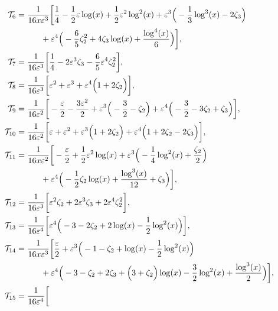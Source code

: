 \begin{align}
% 
\mi_6 &=   \frac{1}{16 x \ep^3}  \bigg[
% 
\frac{1}{4}
-\frac{1}{2} \ep \log (x)
+\frac{1}{2} \ep^2 \log ^2(x)
+\ep^3 \Big(
        -\frac{1}{3} \log ^3(x)
        -2 \zeta_3
\Big)
\nonumber\\& \qquad \quad
+\ep^4 \Big(
        -\frac{6}{5} \zeta_2^2
        +4 \zeta_3 \log (x)
        +\frac{\log ^4(x)}{6}
\Big)
% 
\bigg],
% 
\nonumber\\
% 
\mi_7 &=   \frac{1}{16 \ep^3}  \bigg[
% 
\frac{1}{4}
-2 \ep^3 \zeta_3
-\frac{6}{5} \ep^4 \zeta_2^2
% 
\bigg],
% 
\nonumber\\
% 
\mi_8 &=   \frac{1}{16 \ep^3}  \bigg[
% 
\ep^2
+\ep^3
+\ep^4 \Big(
        1
        +2 \zeta_2
\Big)
% 
\bigg],
% 
\nonumber\\
% 
\mi_9 &=   \frac{1}{16 \ep^2}  \bigg[
% 
-\frac{\ep}{2}
-\frac{3 \ep^2}{2}
+\ep^3 \Big(
        -\frac{3}{2}
        -\zeta_2
\Big)
+\ep^4 \Big(
        -\frac{3}{2}
        -3 \zeta_2
        +\zeta_3
\Big)
% 
\bigg],
% 
\nonumber\\
% 
\mi_{10} &=   \frac{1}{16 \ep^2}  \bigg[
% 
\ep
+\ep^2
+\ep^3 \Big(
        1
        +2 \zeta_2
\Big)
+\ep^4 \Big(
        1
        +2 \zeta_2
        -2 \zeta_3
\Big)
% 
\bigg],
% 
\nonumber\\
% 
\mi_{11} &=   \frac{1}{16 x \ep^2}  \bigg[
% 
-\frac{\ep}{2}
+\frac{1}{2} \ep^2 \log (x)
+\ep^3 \Big(
        -\frac{1}{4} \log ^2(x)
        +\frac{\zeta_2}{2}
\Big)
\nonumber\\& \qquad \quad
+\ep^4 \Big(
        -\frac{1}{2} \zeta_2 \log (x)
        +\frac{\log ^3(x)}{12}
        +\zeta_3
\Big)
% 
\bigg],
% 
\nonumber\\
% 
\mi_{12} &=   \frac{1}{16 \ep^3}  \bigg[
% 
\ep^2 \zeta_2
+2 \ep^3 \zeta_3
+2 \ep^4 \zeta_2^2
% 
\bigg],
% 
\nonumber\\
% 
\mi_{13} &=   \frac{1}{16 \ep^4}  \bigg[
% 
\ep^4 \Big(
        -3
        -2 \zeta_2
        +2 \log (x)
        -\frac{1}{2} \log ^2(x)
\Big)
\bigg],
% 
\nonumber\\
% 
\mi_{14} &=   \frac{1}{16 x \ep^3}  \bigg[
% 
\frac{\ep}{2}
+\ep^3 \Big(
        -1
        -\zeta_2
        +\log (x)
        -\frac{1}{2} \log ^2(x)
\Big)
\nonumber\\& \qquad \quad
+\ep^4 \Big(
        -3
        -\zeta_2
        +2 \zeta_3
        +\Big(
                3
                +\zeta_2
        \Big) \log (x)
        -\frac{3}{2} \log ^2(x)
        +\frac{\log ^3(x)}{2}
\Big)
% 
\bigg],
% 
\nonumber\\
% 
\mi_{15} &=   \frac{1}{16 \ep^4}  \bigg[

\end{align}
